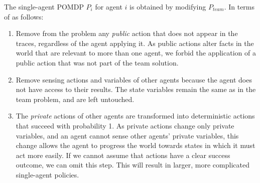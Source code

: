 {The single-agent POMDP $P_i$ for agent $i$ is obtained by modifying $P_{team}$. In terms of
as follows:
\begin{enumerate}
\item Remove from the problem any \emph{public} action that does not appear in the traces, regardless of the agent applying it. As public actions alter facts in the world that are relevant to more than one agent, we  forbid the application of a public action that was not part of the team solution.
\item Remove sensing actions and variables of other agents because the agent does
not have access to their results. The state variables remain the same as in the team problem, and are left untouched.
\item The \emph{private} actions of other agents are transformed into deterministic actions that succeed with probability 1.
As private actions change only private variables, and an agent cannot sense other agents' private variables, this change allows the agent to progress the world towards states in which it must act more easily.
If we cannot assume that actions have a clear success outcome, we can omit this step. This will result in larger, more complicated single-agent policies.


\end{enumerate}}
